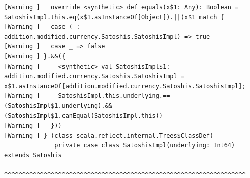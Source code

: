 \documentclass[runningheads]{llncs}
\begin{document}
\begin{lstlisting}[style=stainless]
[Warning ]   override <synthetic> def equals(x$1: Any): Boolean = SatoshisImpl.this.eq(x$1.asInstanceOf[Object]).||(x$1 match {
[Warning ]   case (_: addition.modified.currency.Satoshis.SatoshisImpl) => true
[Warning ]   case _ => false
[Warning ] }.&&({
[Warning ]     <synthetic> val SatoshisImpl$1: addition.modified.currency.Satoshis.SatoshisImpl = x$1.asInstanceOf[addition.modified.currency.Satoshis.SatoshisImpl];
[Warning ]     SatoshisImpl.this.underlying.==(SatoshisImpl$1.underlying).&&(SatoshisImpl$1.canEqual(SatoshisImpl.this))
[Warning ]   }))
[Warning ] } (class scala.reflect.internal.Trees$ClassDef)
              private case class SatoshisImpl(underlying: Int64) extends Satoshis
              ^^^^^^^^^^^^^^^^^^^^^^^^^^^^^^^^^^^^^^^^^^^^^^^^^^^^^^^^^^^^^^^^^^^
\end{lstlisting}
\end{document}

